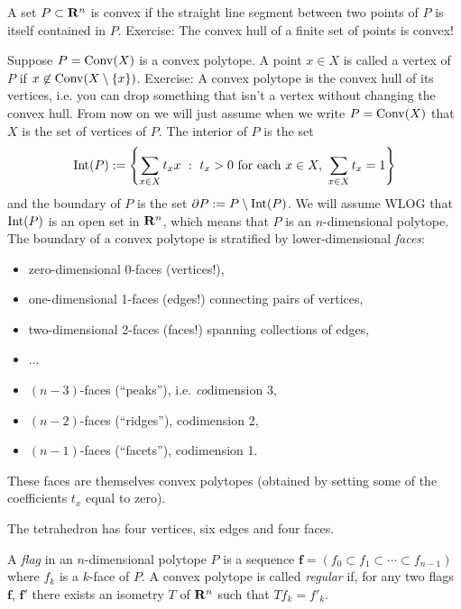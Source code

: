\documentclass[12pt]{article}
\begin{document}
\begin{rmk}
  A set $P\subset\mathbf{R}^n$ is convex if the straight line segment between two points of $P$ is itself contained in $P$. Exercise: The convex hull of a finite set of points is convex!
\end{rmk}

\begin{dfn}
  Suppose $P=\operatorname{Conv}(X)$ is a convex polytope. A point $x\in X$ is called a vertex of $P$ if $x\not\in\operatorname{Conv}(X\setminus\{x\})$. Exercise: A convex polytope is the convex hull of its vertices, i.e. you can drop something that isn't a vertex without changing the convex hull. From now on we will just assume when we write $P=\operatorname{Conv}(X)$ that $X$ is the set of vertices of $P$. The interior of $P$ is the set
  \[\operatorname{Int}(P):=\left\{\sum_{x\in X}t_xx\ :\ t_x>0\mbox{ for each }x\in X,\ \sum_{x\in X}t_x=1\right\}\]
  and the boundary of $P$ is the set $\partial P:=P\setminus\operatorname{Int}(P)$. We will assume WLOG that $\operatorname{Int}(P)$ is an open set in $\mathbf{R}^n$, which means that $P$ is an $n$-dimensional polytope. The boundary of a convex polytope is stratified by lower-dimensional {\em faces}:
  \begin{itemize}
  \item zero-dimensional 0-faces (vertices!),
  \item one-dimensional 1-faces (edges!) connecting pairs of vertices,
  \item two-dimensional 2-faces (faces!) spanning collections of edges,
  \item ...
  \item $(n-3)$-faces (``peaks''), i.e. {\em co}dimension 3,
  \item $(n-2)$-faces (``ridges''), codimension 2,
  \item $(n-1)$-faces (``facets''), codimension 1.
  \end{itemize}
  These faces are themselves convex polytopes (obtained by setting some of the coefficients $t_x$ equal to zero).
\end{dfn}

\begin{exm}
The tetrahedron has four vertices, six edges and four faces.
\end{exm}

\begin{dfn}
  A {\em flag} in an $n$-dimensional polytope $P$ is a sequence $\mathbf{f}=(f_0\subset f_1\subset\cdots\subset f_{n-1})$ where $f_k$ is a $k$-face of $P$. A convex polytope is called {\em regular} if, for any two flags $\mathbf{f}$, $\mathbf{f}'$ there exists an isometry $T$ of $\mathbf{R}^n$ such that $Tf_k=f'_k$.
\end{dfn}
\end{document}
